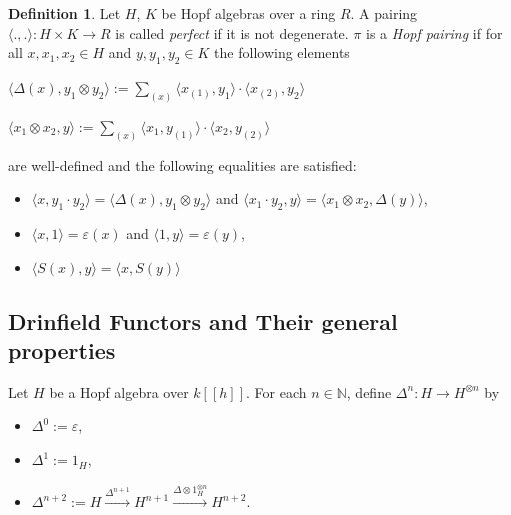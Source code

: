 \documentclass[8pt]{article}
\theoremstyle{definition}
\newtheorem{definition}{Definition}[section]
\theoremstyle{definition}
\theoremstyle{definition}
\theoremstyle{definition}
\theoremstyle{definition}
\theoremstyle{definition}
\theoremstyle{definition}
\theoremstyle{definition}
\theoremstyle{definition}
\theoremstyle{definition}
\theoremstyle{definition}
\theoremstyle{definition}
\theoremstyle{definition}
\theoremstyle{definition}
\theoremstyle{question}
\begin{document}
\begin{definition}
  Let $H$, $K$ be Hopf algebras over a ring $R$. A pairing $\langle ., .\rangle : H \times K \to R$ is called \emph{perfect} if
  it is not degenerate. $\pi$ is a \emph{Hopf pairing} if for all $x, x_1, x_2 \in H$ and $y, y_1, y_2 \in K$
  the following elements
  \begin{center}
    $\langle \Delta(x), y_1 \otimes y_2 \rangle := \sum \limits_{(x)} \langle x_{(1)}, y_1 \rangle \cdot \langle x_{(2)}, y_2 \rangle$ 

    $\langle x_1 \otimes x_2, y \rangle := \sum \limits_{(x)} \langle x_1, y_{(1)} \rangle \cdot \langle x_2, y_{(2)} \rangle$
  \end{center}
  are well-defined and the following equalities are satisfied:
  \begin{itemize}
    \item $\langle x, y_1 \cdot y_2 \rangle = \langle \Delta(x), y_1 \otimes y_2 \rangle$ and $\langle x_1 \cdot y_2, y\rangle = \langle x_1 \otimes x_2, \Delta(y) \rangle$,
    \item $\langle x, 1 \rangle = \varepsilon(x)$ and $\langle 1, y \rangle = \varepsilon(y)$,
    \item $\langle S(x) , y \rangle = \langle x, S(y) \rangle$
  \end{itemize}
\end{definition}

\subsection{Drinfield Functors and Their general properties}

Let $H$ be a Hopf algebra over $k[[h]]$. For each $n \in \mathbb{N}$, define $\Delta^n : H \to H^{\otimes n}$ by 
\begin{itemize}
  \item $\Delta^0 := \varepsilon$,
  \item $\Delta^1 := 1_H$,
  \item $\Delta^{n + 2} := H \xrightarrow{\Delta^{n + 1}} H^{n + 1} \xrightarrow{\Delta \otimes 1^{\otimes n}_H} H^{n + 2}$.
\end{itemize}
\end{document}
